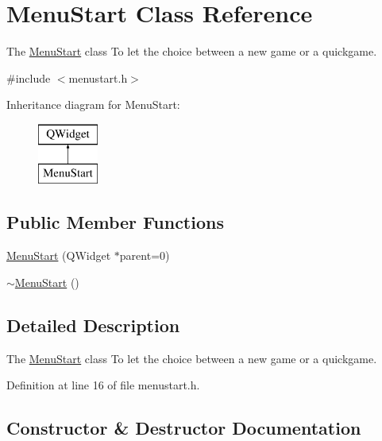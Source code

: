 \hypertarget{class_menu_start}{}\section{Menu\+Start Class Reference}
\label{class_menu_start}


The \hyperlink{class_menu_start}{Menu\+Start} class To let the choice between a new game or a quickgame.  




{\ttfamily \#include $<$menustart.\+h$>$}

Inheritance diagram for Menu\+Start\+:\begin{figure}[H]
\begin{center}
\leavevmode
\includegraphics[height=2.000000cm]{class_menu_start}
\end{center}
\end{figure}
\subsection*{Public Member Functions}
\begin{DoxyCompactItemize}
\item 
\hyperlink{class_menu_start_a184ff65bb2534378670fee22487b02eb}{Menu\+Start} (Q\+Widget $\ast$parent=0)
\item 
\hyperlink{class_menu_start_a3c8fe892ee7171d64a9857f44ad326ba}{$\sim$\+Menu\+Start} ()
\end{DoxyCompactItemize}


\subsection{Detailed Description}
The \hyperlink{class_menu_start}{Menu\+Start} class To let the choice between a new game or a quickgame. 

Definition at line 16 of file menustart.\+h.



\subsection{Constructor \& Destructor Documentation}
\hypertarget{class_menu_start_a184ff65bb2534378670fee22487b02eb}{}\label{class_menu_start_a184ff65bb2534378670fee22487b02eb} 
